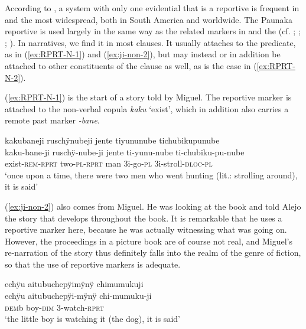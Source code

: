According to \citet[251]{Aikhenvald2012}, a system with only one evidential that is a reportive is frequent in  and the most widespread, both in South America and worldwide.
The Paunaka reportive is used largely in the same way as the related markers in  and the  (cf. \citealt[956]{OlzaZubiri2004}; \citealt[377--378]{Danielsen2007}; \citealt[48]{Jorda2014}; \citealt[83]{Rose2014a}).
In narratives, we find it in most clauses. It usually attaches to the predicate, as in (\ref{ex:RPRT-N-1}) and (\ref{ex:ji-non-2}), but may instead or in addition be attached to other constituents of the clause as well, as is the case in (\ref{ex:RPRT-N-2}).

(\ref{ex:RPRT-N-1}) is the start of a story told by Miguel. The reportive marker is attached to the non-verbal copula \textit{kaku} ‘exist’, which in addition also carries a remote past marker \textit{-bane}.

\ea\label{ex:RPRT-N-1}
\begingl
\glpreamble kakubaneji ruschÿnubeji jente tiyununube tichubikupunube\\
\gla kaku-bane-ji ruschÿ-nube-ji jente ti-yunu-nube ti-chubiku-pu-nube\\
\glb exist-\textsc{rem}-\textsc{rprt} two-\textsc{pl}-\textsc{rprt} man 3i-go-\textsc{pl} 3i-stroll-\textsc{dloc}-\textsc{pl}\\
\glft ‘once upon a time, there were two men who went hunting (lit.: strolling around), it is said’
\endgl
\trailingcitation{[mxx-n101017s-1.014]}
\xe

(\ref{ex:ji-non-2}) also comes from Miguel. He was looking at the  book and told Alejo the story that develops throughout the book. It is remarkable that he uses a reportive marker here, because he was actually witnessing what was going on. However, the proceedings in a picture book are of course not real, and Miguel’s re-narration of the story thus definitely falls into the realm of the genre of fiction, so that the use of reportive markers is adequate.

\ea\label{ex:ji-non-2}
\begingl 
\glpreamble echÿu aitubuchepÿimÿnÿ chimumukuji\\
\gla echÿu aitubuchepÿi-mÿnÿ chi-mumuku-ji\\ 
\glb \textsc{dem}b boy-\textsc{dim} 3-watch-\textsc{rprt}\\ 
\glft ‘the little boy is watching it (the dog), it is said’\\ 
\endgl
\trailingcitation{[mtx-a110906l.013]}
\xe

